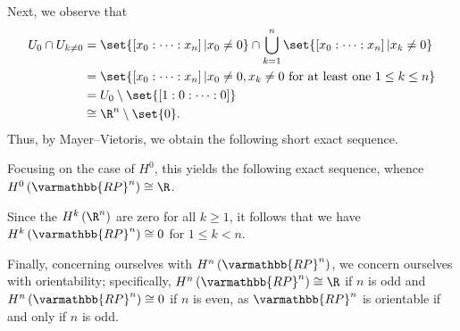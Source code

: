 \documentclass[10pt]{mypackage}
\renewcommand*{\mathbb}[1]{\varmathbb{#1}}
\begin{document}
\begin{solution}
  Next, we observe that
  \begin{align*}
    U_0\cap U_{k\neq 0} &= \set{\left[ x_0:\cdots:x_n \right] | x_0\neq 0} \cap \bigcup_{k=1}^{n} \set{\left[ x_0:\cdots:x_n \right] | x_k\neq 0}\\
                        &= \set{\left[ x_0 : \cdots : x_n \right] | x_0\neq 0, x_k\neq 0\text{ for at least one } 1\leq k \leq n}\\
                        &= U_0\setminus \set{\left[ 1:0:\cdots:0 \right]}\\
                        &\cong \R^{n}\setminus \set{0}.
  \end{align*}
  Thus, by Mayer--Vietoris, we obtain the following short exact sequence.
  \begin{center}
  \end{center}
  Focusing on the case of $H^{0}$, this yields the following exact sequence, whence $H^{0}\left( \mathbb{RP}^n \right)\cong \R$.
  \begin{center}
  \end{center}
  Since the $H^{k}\left( \R^{n} \right)$ are zero for all $k\geq 1$, it follows that we have $H^{k}\left( \mathbb{RP}^{n} \right) \cong 0$ for $1\leq k < n$.\newline

  Finally, concerning ourselves with $H^{n}\left( \mathbb{RP}^{n} \right)$, we concern ourselves with orientability; specifically, $H^{n}\left( \mathbb{RP}^{n} \right) \cong \R$ if $n$ is odd and $H^{n}\left( \mathbb{RP}^{n} \right) \cong 0$ if $n$ is even, as $ \mathbb{RP}^{n} $ is orientable if and only if $n$ is odd.
\end{solution}
\end{document}
